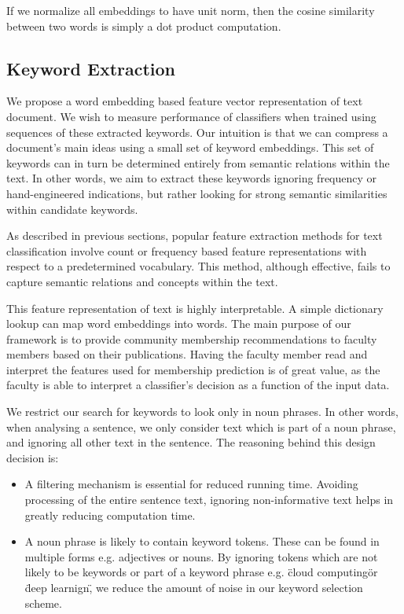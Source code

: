 \documentclass[12pt]{article}
\begin{document}
If we normalize all embeddings to have unit norm, then the cosine similarity between two words is simply a dot product computation.

\subsection{Keyword Extraction}
We propose a word embedding based feature vector representation of text document. We wish to measure performance of classifiers when trained using sequences of these
extracted keywords. Our intuition is that we can compress a document's main ideas using a small set of keyword embeddings. This set of keywords can in turn
be determined entirely from semantic relations within the text. In other words, we aim to extract these keywords ignoring frequency or hand-engineered
indications, but rather looking for strong semantic similarities within candidate keywords.

As described in previous sections, popular feature extraction methods for text classification involve count or frequency based feature representations with respect to
a predetermined vocabulary. This method, although effective, fails to capture semantic relations and concepts within the text.

This feature representation of text is highly interpretable. A simple dictionary lookup can map word embeddings into words.
The main purpose of our framework is to provide community membership recommendations to faculty members
based on their publications. Having the faculty member read and interpret the features used for membership prediction is of great value,
as the faculty is able to interpret a classifier's decision as a function of the input data.

We restrict our search for keywords to look only in noun phrases. In other words, when analysing a sentence, we only consider text which is
part of a noun phrase, and ignoring all other text in the sentence. The reasoning behind this design decision is:
\begin{itemize}
\item A filtering mechanism is essential for reduced running time. Avoiding processing of the entire sentence text, ignoring non-informative text
helps in greatly reducing computation time.
\item A noun phrase is likely to contain keyword tokens. These can be found in multiple forms e.g. adjectives or nouns. By ignoring tokens which
are not likely to be keywords or part of a keyword phrase e.g. \"cloud computing\" or \"deep learnign\", we reduce the amount of noise in our keyword
selection scheme.
\end{itemize}
\end{document}
